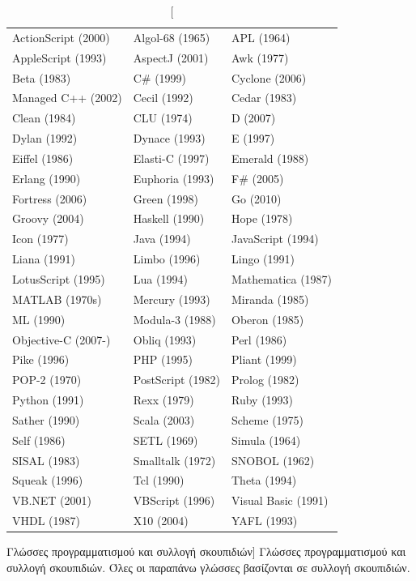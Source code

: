 \begin{greek}
\begin{table}
  \centering
  \begin{tabular}{|l|l|l|}
    \hline
    ActionScript (2000) & Algol-68 (1965)   & APL (1964)\\
    AppleScript (1993)  & AspectJ (2001)    & Awk (1977)\\
    Beta (1983)         & C\# (1999)        & Cyclone (2006)\\
    Managed C++ (2002)  & Cecil (1992)      & Cedar (1983)\\
    Clean (1984)        & CLU (1974)        & D (2007)\\
    Dylan (1992)        & Dynace (1993)     & E (1997)\\
    Eiffel (1986)       & Elasti-C (1997)   & Emerald (1988)\\
    Erlang (1990)       & Euphoria (1993)   & F\# (2005)\\ 
    Fortress (2006)     & Green (1998)      & Go (2010)\\
    Groovy (2004)       & Haskell (1990)    & Hope (1978)\\
    Icon (1977)         & Java (1994)       & JavaScript (1994)\\
    Liana (1991)        & Limbo (1996)      & Lingo (1991)\\
    LotusScript (1995)  & Lua (1994)        & Mathematica (1987)\\
    MATLAB (1970s)      & Mercury (1993)    & Miranda (1985)\\
    ML (1990)           & Modula-3 (1988)   & Oberon (1985)\\
    Objective-C (2007-) & Obliq (1993)      & Perl (1986)\\
    Pike (1996)         & PHP (1995)        & Pliant (1999)\\
    POP-2 (1970)        & PostScript (1982) & Prolog (1982)\\
    Python (1991)       & Rexx (1979)       & Ruby (1993)\\
    Sather (1990)       & Scala (2003)      & Scheme (1975)\\
    Self (1986)         & SETL (1969)       & Simula (1964)\\
    SISAL (1983)        & Smalltalk (1972)  & SNOBOL (1962)\\
    Squeak (1996)       & Tcl (1990)        & Theta (1994)\\
    VB.NET (2001)       & VBScript (1996)   & Visual Basic (1991)\\
    VHDL (1987)         & X10 (2004)        & YAFL (1993)\\
    \hline
  \end{tabular}
  \caption
    [Γλώσσες προγραμματισμού και συλλογή σκουπιδιών]
    {Γλώσσες προγραμματισμού και συλλογή σκουπιδιών. Όλες οι
     παραπάνω γλώσσες βασίζονται σε συλλογή σκουπιδιών.}
  \label{tab:intro_1}
\end{table}


\end{greek}
